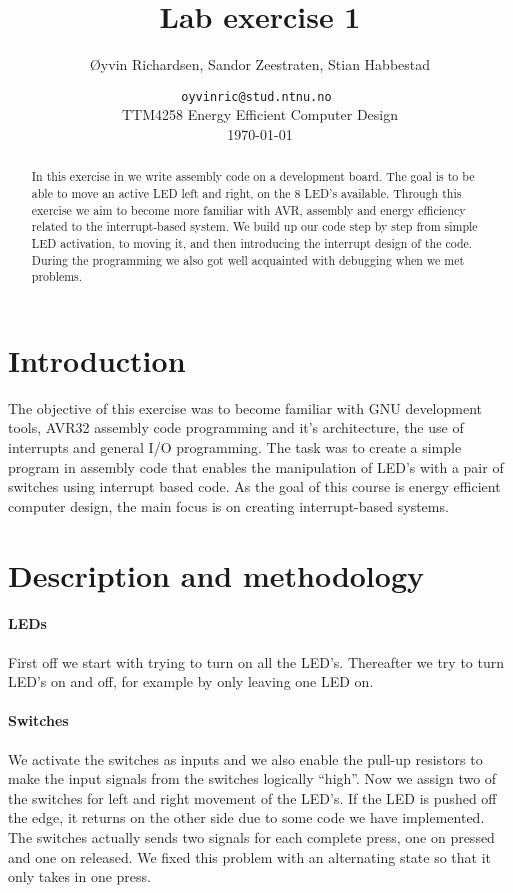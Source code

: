 \documentclass[a4paper,11pt]{article}
\title{Lab exercise 1}
\author{\O yvin Richardsen, Sandor Zeestraten, Stian Habbestad}
\date{ {\tt oyvinric@stud.ntnu.no }\\
TTM4258 Energy Efficient Computer Design \\
\today}
\begin{document}
\maketitle
\newpage

\begin{abstract}
In this exercise in we write assembly code on a development board. The goal is to be able to move an active LED left and right, on the 8 LED's available. Through this exercise we aim to become more familiar with AVR, assembly and energy efficiency related to the interrupt-based system. We build up our code step by step from simple LED activation, to moving it, and then introducing the interrupt design of the code. During the programming we also got well acquainted with debugging when we met problems.
\end{abstract}
\newpage

\tableofcontents
\newpage



\section{Introduction}
The objective of this exercise was to become familiar with GNU development tools, AVR32 assembly code programming and it’s architecture, the use of interrupts and general I/O programming. The task was to create a simple program in assembly code that enables the manipulation of LED’s with a pair of switches using interrupt based code. As the goal of this course is energy efficient computer design, the main focus is on creating interrupt-based systems. 

\section{Description and methodology}
\paragraph{LEDs}
First off we start with trying to turn on all the LED’s. Thereafter we try to turn LED’s on and off, for example by only leaving one LED on. 

\paragraph{Switches}
We activate the switches as inputs and we also enable the pull-up resistors to make the input signals from the switches logically “high”. 
Now we assign two of the switches for left and right movement of the LED’s. If the LED is pushed off the edge, it returns on the other side due to some code we have implemented.
The switches actually sends two signals for each complete press, one on pressed and one on released. We fixed this problem with an alternating state so that it only takes in one press. 
\end{document}
